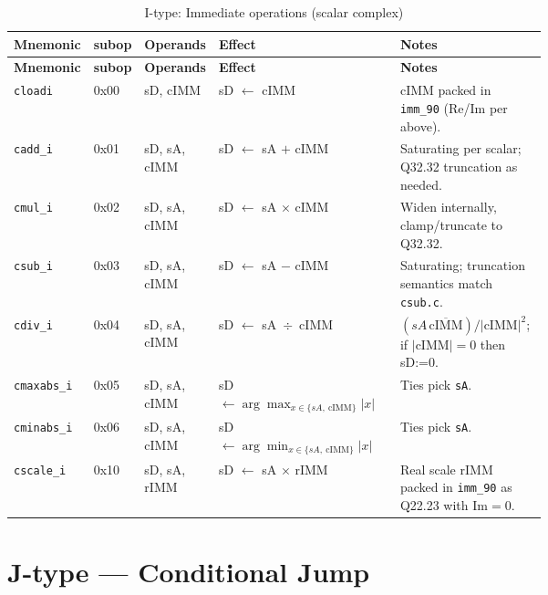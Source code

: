 \documentclass[10pt]{article}
\begin{document}
\begin{longtable}{@{}l l l L{0.38\linewidth} L{0.30\linewidth}@{}}
\caption{I-type: Immediate operations (scalar complex)}\label{tab:itype}\\
\toprule
\textbf{Mnemonic} & \textbf{subop} & \textbf{Operands} & \textbf{Effect} & \textbf{Notes} \\
\midrule
\endfirsthead
\toprule
\textbf{Mnemonic} & \textbf{subop} & \textbf{Operands} & \textbf{Effect} & \textbf{Notes} \\
\midrule
\endhead
\texttt{cloadi}   & 0x00 & sD, cIMM       & sD $\leftarrow$ cIMM
  & cIMM packed in \texttt{imm\_90} (Re/Im per above). \\

\texttt{cadd\_i}  & 0x01 & sD, sA, cIMM   & sD $\leftarrow$ sA $+$ cIMM
  & Saturating per scalar; Q32.32 truncation as needed. \\

\texttt{cmul\_i}  & 0x02 & sD, sA, cIMM   & sD $\leftarrow$ sA $\times$ cIMM
  & Widen internally, clamp/truncate to Q32.32. \\

\texttt{csub\_i}  & 0x03 & sD, sA, cIMM   & sD $\leftarrow$ sA $-$ cIMM
  & Saturating; truncation semantics match \texttt{csub.c}. \\

\texttt{cdiv\_i}  & 0x04 & sD, sA, cIMM   & sD $\leftarrow$ sA \,$\div$\, cIMM
  & $(sA\,\overline{\text{cIMM}})/|\text{cIMM}|^2$; if $|\text{cIMM}|{=}0$ then sD:=0. \\

\texttt{cmaxabs\_i} & 0x05 & sD, sA, cIMM & sD $\leftarrow \arg\max_{x\in\{sA,\ \text{cIMM}\}} |x|$
  & Ties pick \texttt{sA}. \\

\texttt{cminabs\_i} & 0x06 & sD, sA, cIMM & sD $\leftarrow \arg\min_{x\in\{sA,\ \text{cIMM}\}} |x|$
  & Ties pick \texttt{sA}. \\

\texttt{cscale\_i} & 0x10 & sD, sA, rIMM  & sD $\leftarrow$ sA $\times$ rIMM
  & Real scale rIMM packed in \texttt{imm\_90} as Q22.23 with $\mathrm{Im}{=}0$. \\

\bottomrule
\end{longtable}

\section*{J-type — Conditional Jump}
\end{document}
